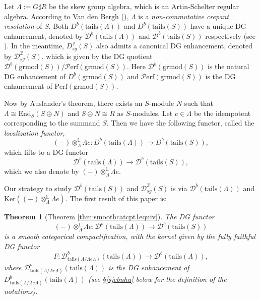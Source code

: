 \documentclass[11pt,reqno]{amsart}
\newtheorem{theorem}{Theorem}[section]
\theoremstyle{definition}
\begin{document}
Let $\Lambda := G \sharp R$
be the skew group algebra, which is an Artin-Schelter regular algebra.
According to Van den Bergh (\cite{V2}), $\Lambda$ is a 
{\it non-commutative crepant resolution} of $S$. 
Both $ D^{b}(\mathrm{tails}(\Lambda))$ and 
$D^{b}(\mathrm{tails}(S))$
have a unique DG enhancement, denoted by 
$\mathcal{D}^{b}(\mathrm{tails}(\Lambda))$
and $\mathcal{D}^{b}(\mathrm{tails}(S))$ respectively 
(see \cite[Theorem A]{CNS}). 
In the meantime, $D_{sg}^{\mathbb Z}(S)$ also
admits a canonical 
DG enhancement, denoted by $\mathcal{D}_{sg}^{\mathbb Z}(S)$,  
which is given by the DG quotient 
$\mathcal{D}^{b}(\mathrm{grmod}(S))/ \mathcal{P}\mathrm{erf}(\mathrm{grmod}(S))$. 
Here $\mathcal{D}^{b}(\mathrm{grmod}(S))$ is the natural DG enhancement of 
$D^{b}(\mathrm{grmod}(S))$ and $\mathcal{P}\mathrm{erf}(\mathrm{grmod}(S))$ 
is the DG enhancement of $\mathrm{Perf}(\mathrm{grmod}(S))$. 

Now by Auslander's theorem,
there exists an $S$-module $N$ such that
$\Lambda \cong \mathrm{End}_{S}(S \oplus N)$ and $S \oplus N \cong R$ as $S$-modules.
Let $e \in \Lambda$ be the 
idempotent 
corresponding to the summand $S$.
Then we have the following functor, 
called the {\it localization functor},   
$$
(-)\otimes_{\Lambda}^{\mathbb{L}} 
\Lambda e: D^{b}(\mathrm{tails}(\Lambda)) 
\rightarrow D^{b}(\mathrm{tails}(S)),
$$
which lifts to a DG functor 
$$
\mathcal{D}^{b}(\mathrm{tails}(\Lambda)) 
\rightarrow \mathcal{D}^{b}(\mathrm{tails}(S)), 
$$
which we also denote by $(-)\otimes_{\Lambda}^{\mathbb{L}} 
\Lambda e$.  

Our strategy to study 
$\mathcal{D}^{b}(\mathrm{tails}(S))$ and 
$\mathcal{D}^{\mathbb{Z}}_{sg}(S)$ 
is via 
$\mathcal{D}^{b}(\mathrm{tails}(\Lambda))$ and 
$\mathrm{Ker}((-)\otimes_{\Lambda}^{\mathbb{L}} \Lambda e )$. 
The first result of this paper is:

\begin{theorem}[Theorem \ref{thm:smoothcatcpt1equiv}]
\label{thm:smoothcatcpt1}
The DG functor
$$
 (-) \otimes^{\mathbb{L}}_{\Lambda} 
 \Lambda e: \mathcal{D}^{b}(\mathrm{tails}(\Lambda)) 
\rightarrow \mathcal{D}^{b}(\mathrm{tails}(S))
$$
is a smooth categorical compactification, 
with the kernel given by the fully faithful DG functor
$$
F: \mathcal{D}^{b}_{\mathrm{tails}(\Lambda/\Lambda e \Lambda)}
(\mathrm{tails}(\Lambda)) 
\rightarrow \mathcal{D}^{b}(\mathrm{tails}(\Lambda)),
$$
where 
$\mathcal{D}^{b}_{\mathrm{tails}(\Lambda/\Lambda e \Lambda)}(\mathrm{tails}
(\Lambda))$ is the 
DG enhancement of 
$D^{b}_{\mathrm{tails}(\Lambda/\Lambda e \Lambda)}(\mathrm{tails}
(\Lambda))$ (see \S \ref{sjcbnhu} below
for the definition of the notations).
\end{theorem}
\end{document}

